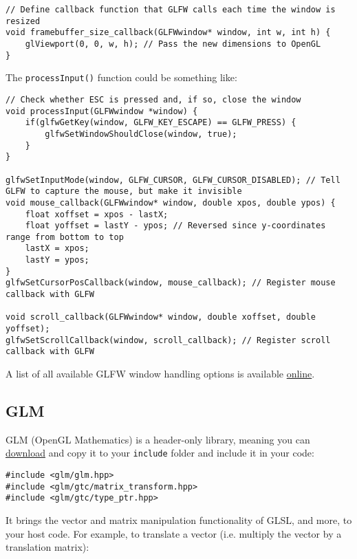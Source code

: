 \documentclass[8pt, table, xcdraw]{article}%
\begin{document}
\begin{lstlisting}
// Define callback function that GLFW calls each time the window is resized
void framebuffer_size_callback(GLFWwindow* window, int w, int h) {
    glViewport(0, 0, w, h); // Pass the new dimensions to OpenGL
}
\end{lstlisting}

The \lstinline{processInput()} function could be something like:

\begin{lstlisting}
// Check whether ESC is pressed and, if so, close the window
void processInput(GLFWwindow *window) {
    if(glfwGetKey(window, GLFW_KEY_ESCAPE) == GLFW_PRESS) {
        glfwSetWindowShouldClose(window, true);
    }
}

glfwSetInputMode(window, GLFW_CURSOR, GLFW_CURSOR_DISABLED); // Tell GLFW to capture the mouse, but make it invisible
void mouse_callback(GLFWwindow* window, double xpos, double ypos) {
    float xoffset = xpos - lastX;
    float yoffset = lastY - ypos; // Reversed since y-coordinates range from bottom to top
    lastX = xpos;
    lastY = ypos;
}
glfwSetCursorPosCallback(window, mouse_callback); // Register mouse callback with GLFW

void scroll_callback(GLFWwindow* window, double xoffset, double yoffset);
glfwSetScrollCallback(window, scroll_callback); // Register scroll callback with GLFW
\end{lstlisting}

A list of all available GLFW window handling options is available \href{https://www.glfw.org/docs/latest/window.html#window_hints}{online}.

\subsection{GLM} \label{GLM}

GLM (OpenGL Mathematics) is a header-only library, meaning you can \href{https://glm.g-truc.net/0.9.8/index.html}{download} and copy it to your \lstinline{include} folder and include it in your code:

\begin{lstlisting}
#include <glm/glm.hpp>
#include <glm/gtc/matrix_transform.hpp>
#include <glm/gtc/type_ptr.hpp>
\end{lstlisting}

It brings the vector and matrix manipulation functionality of GLSL, and more, to your host code. For example, to translate a vector (i.e. multiply the vector by a translation matrix):
\end{document}

